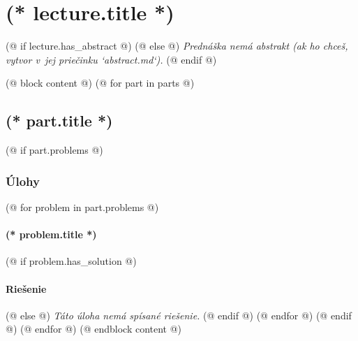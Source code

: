 \documentclass[12pt, twoside]{dgs}
\numberwithin{equation}{subsection}
\numberwithin{figure}{subsection}
\begin{document}
    \pagestyle{scholar}
    \section{(* lecture.title *)}%
    (@ if lecture.has_abstract @)
        \textit{}%
    (@ else @)
        \textit{Prednáška nemá abstrakt (ak ho chceš, vytvor v\ jej priečinku `abstract.md`).}
    (@ endif @)

    (@ block content @)
        (@ for part in parts @)
            \subsection{\texorpdfstring{(* part.title *)}{(* part.pdftitle|default(part.title) *)}}
                
                (@ if part.problems @)
                    \subsubsection{Úlohy}
                    (@ for problem in part.problems @)
                        \paragraph{(* problem.title *)}
                        (@ if problem.has_solution @)
                            \paragraph{Riešenie}
                        (@ else @)
                            \textit{Táto úloha nemá spísané riešenie.}
                        (@ endif @)
                    (@ endfor @)
                (@ endif @)
        (@ endfor @)
    (@ endblock content @)
\end{document}

